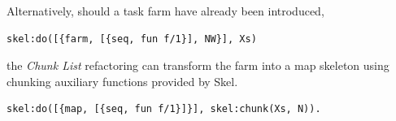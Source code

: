 \documentclass[final]{jfp1}
\begin{document}
Alternatively, should a task farm have already been introduced,
% 
\begin{lstlisting}
skel:do([{farm, [{seq, fun f/1}], NW}], Xs)
\end{lstlisting}
%
\noindent
the \emph{Chunk List} refactoring can transform the farm into a map skeleton
using chunking auxiliary functions provided by Skel.
%
\begin{lstlisting}
skel:do([{map, [{seq, fun f/1}]}], skel:chunk(Xs, N)).
\end{lstlisting}

\fi






\end{document}
